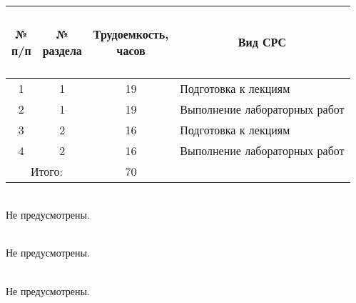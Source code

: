 \\

\begin{center}
\begin{longtable}{|c|c|c|p{}|}\hline
\multicolumn{1}{|c|}{\parbox[c]{.6cm}{\bfseries~\\№\\п/п\\~}} &
\multicolumn{1}{c|}{\parbox[c]{1.7cm}{\bfseries №\\раздела}} &
\multicolumn{1}{c|}{\parbox[c]{3cm}{\bfseries Трудоемкость,\\часов}} &
\multicolumn{1}{c|}{\parbox[c]{4cm}{\bfseries Вид СРС}} \\\hline
1 & 1 & 19 & Подготовка к лекциям\\\hline
2 & 1 & 19 & Выполнение лабораторных работ\\\hline
3 & 2 & 16 & Подготовка к лекциям\\\hline
4 & 2 & 16 & Выполнение лабораторных работ\\\hline

\multicolumn{2}{|c|}{Итого:} & 70 & \\\hline
\end{longtable}
\end{center}


\\
Не предусмотрены.

\\
Не предусмотрены.

\\
Не предусмотрены.